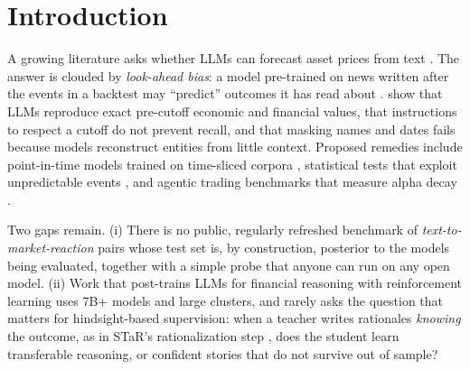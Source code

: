 \documentclass{article}
\begin{document}
\section{Introduction}

A growing literature asks whether LLMs can forecast asset prices from text \citep{lopezlira2023chatgpt,
kim2024financial}. The answer is clouded by \emph{look-ahead bias}: a model pre-trained on news written after the
events in a backtest may ``predict'' outcomes it has read about
\citep{glasserman2023lookahead,sarkar2025lookahead}. \citet{lopezlira2025memorization} show that LLMs reproduce exact
pre-cutoff economic and financial values, that instructions to respect a cutoff do not prevent recall, and that
masking names and dates fails because models reconstruct entities from little context. Proposed remedies include
point-in-time models trained on time-sliced corpora \citep{he2025chronologically}, statistical tests that exploit
unpredictable events \citep{sarkar2025lookahead,gao2025detecting}, and agentic trading benchmarks that measure alpha
decay \citep{benhenda2026lookahead}.

Two gaps remain. (i) There is no public, regularly refreshed benchmark of \emph{text-to-market-reaction} pairs whose
test set is, by construction, posterior to the models being evaluated, together with a simple probe that anyone can
run on any open model. (ii) Work that post-trains LLMs for financial reasoning with reinforcement learning
\citep{liu2025finr1,xiao2025tradingr1} uses 7B+ models and large clusters, and rarely asks the question that matters
for hindsight-based supervision: when a teacher writes rationales \emph{knowing} the outcome, as in STaR's
rationalization step \citep{zelikman2022star}, does the student learn transferable reasoning, or confident stories
that do not survive out of sample?
\end{document}
